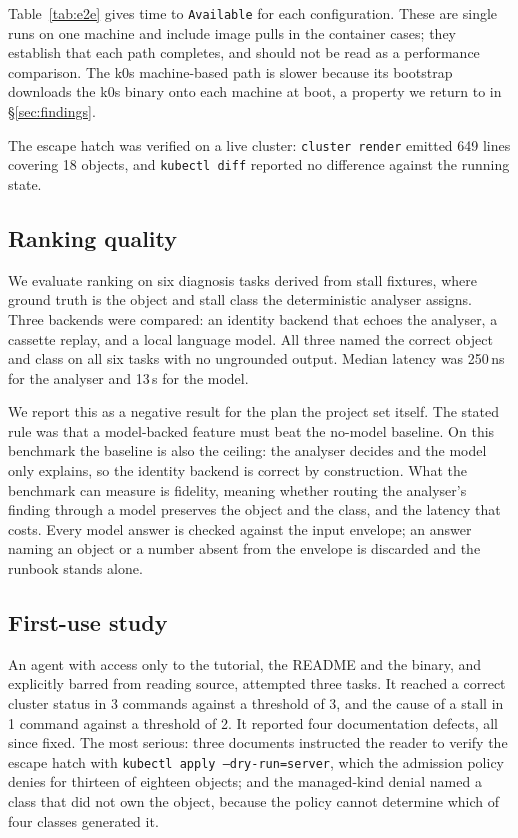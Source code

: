 \documentclass[conference]{IEEEtran}
\begin{document}
Table~\ref{tab:e2e} gives time to \texttt{Available} for each configuration. These
are single runs on one machine and include image pulls in the container cases;
they establish that each path completes, and should not be read as a performance
comparison. The k0s machine-based path is slower because its bootstrap downloads
the k0s binary onto each machine at boot, a property we return to in
\S\ref{sec:findings}.

The escape hatch was verified on a live cluster: \texttt{cluster render} emitted
649 lines covering 18 objects, and \texttt{kubectl diff} reported no difference
against the running state.

\subsection{Ranking quality}

We evaluate ranking on six diagnosis tasks derived from stall fixtures, where
ground truth is the object and stall class the deterministic analyser assigns.
Three backends were compared: an identity backend that echoes the analyser, a
cassette replay, and a local language model. All three named the correct object
and class on all six tasks with no ungrounded output. Median latency was 250\,ns
for the analyser and 13\,s for the model.

We report this as a negative result for the plan the project set itself. The stated
rule was that a model-backed feature must beat the no-model baseline. On this
benchmark the baseline is also the ceiling: the analyser decides and the model only
explains, so the identity backend is correct by construction. What the benchmark
can measure is fidelity, meaning whether routing the analyser's finding through a
model preserves the object and the class, and the latency that costs. Every model
answer is checked against the input envelope; an answer naming an object or a
number absent from the envelope is discarded and the runbook stands alone.

\subsection{First-use study}

An agent with access only to the tutorial, the README and the binary, and
explicitly barred from reading source, attempted three tasks. It reached a correct
cluster status in 3 commands against a threshold of 3, and the cause of a stall in
1 command against a threshold of 2. It reported four documentation defects, all
since fixed. The most serious: three documents instructed the reader to verify the
escape hatch with \texttt{kubectl apply --dry-run=server}, which the admission
policy denies for thirteen of eighteen objects; and the managed-kind denial named
a class that did not own the object, because the policy cannot determine which of
four classes generated it.
\end{document}
